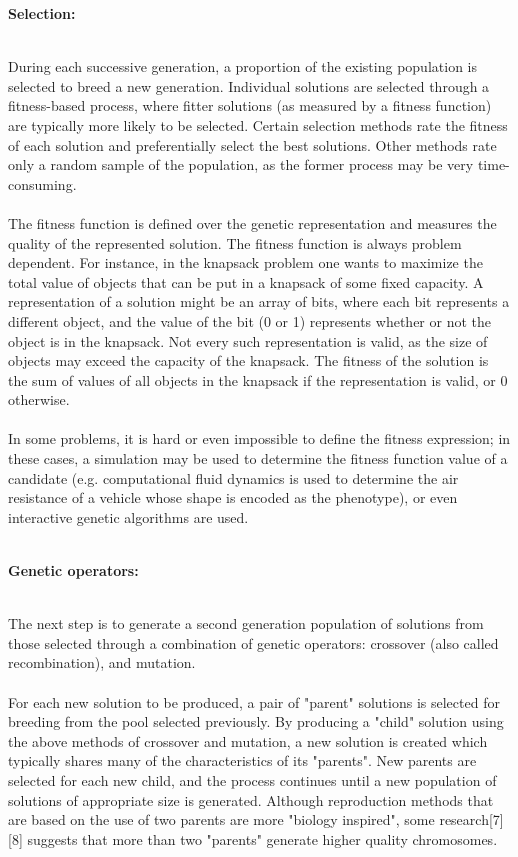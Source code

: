 \documentclass[a4paper, 12pt]{article}
\begin{document}
\begin{large}\textbf{Selection:}\end{large}\\
During each successive generation, a proportion of the existing population is selected to breed a new generation. Individual solutions are selected through a fitness-based process, where fitter solutions (as measured by a fitness function) are typically more likely to be selected. Certain selection methods rate the fitness of each solution and preferentially select the best solutions. Other methods rate only a random sample of the population, as the former process may be very time-consuming.\\~\\
\noindent
The fitness function is defined over the genetic representation and measures the quality of the represented solution. The fitness function is always problem dependent. For instance, in the knapsack problem one wants to maximize the total value of objects that can be put in a knapsack of some fixed capacity. A representation of a solution might be an array of bits, where each bit represents a different object, and the value of the bit (0 or 1) represents whether or not the object is in the knapsack. Not every such representation is valid, as the size of objects may exceed the capacity of the knapsack. The fitness of the solution is the sum of values of all objects in the knapsack if the representation is valid, or 0 otherwise.\\~\\
\noindent
In some problems, it is hard or even impossible to define the fitness expression; in these cases, a simulation may be used to determine the fitness function value of a candidate (e.g. computational fluid dynamics is used to determine the air resistance of a vehicle whose shape is encoded as the phenotype), or even interactive genetic algorithms are used.\\~\\
\begin{large}\textbf{Genetic operators:}\end{large}\\
The next step is to generate a second generation population of solutions from those selected through a combination of genetic operators: crossover (also called recombination), and mutation.\\~\\
\noindent
For each new solution to be produced, a pair of "parent" solutions is selected for breeding from the pool selected previously. By producing a "child" solution using the above methods of crossover and mutation, a new solution is created which typically shares many of the characteristics of its "parents". New parents are selected for each new child, and the process continues until a new population of solutions of appropriate size is generated. Although reproduction methods that are based on the use of two parents are more "biology inspired", some research[7][8] suggests that more than two "parents" generate higher quality chromosomes.\\~\\
\end{document}
